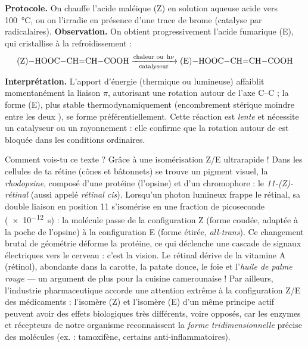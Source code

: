\documentclass[11pt]{article}
\newcommand{\cle}[1]{{\popxbold\color{popdark}#1}}
\begin{document}
\begin{experience}
\textbf{Protocole.} On chauffe l'acide maléique (Z) en solution aqueuse acide vers \SI{100}{\celsius}, ou on l'irradie en présence d'une trace de brome (catalyse par radicalaires).
\textbf{Observation.} On obtient progressivement l'acide fumarique (E), qui cristallise à la refroidissement :
\[ \ce{(Z)-HOOC-CH=CH-COOH ->[\text{chaleur ou } h\nu][\text{catalyseur}] (E)-HOOC-CH=CH-COOH} \]
\textbf{Interprétation.} L'apport d'énergie (thermique ou lumineuse) affaiblit momentanément la liaison $\pi$, autorisant une rotation autour de l'axe C--C ; la forme (E), plus stable thermodynamiquement (encombrement stérique moindre entre les deux ), se forme préférentiellement. Cette réaction est \emph{lente} et nécessite un catalyseur ou un rayonnement : elle confirme que la rotation autour de  est bloquée dans les conditions ordinaires.
\end{experience}

\begin{savaistu}
Comment vois-tu ce texte ? Grâce à une isomérisation Z/E ultrarapide ! Dans les cellules de ta rétine (cônes et bâtonnets) se trouve un pigment visuel, la \emph{rhodopsine}, composé d'une protéine (l'opsine) et d'un chromophore : le \emph{11-(Z)-rétinal} (aussi appelé \emph{rétinal cis}). Lorsqu'un photon lumineux frappe le rétinal, sa double liaison en position 11 s'isomérise en une fraction de picoseconde (\SI{e-12}{\second}) : la molécule passe de la configuration \cle{Z} (forme coudée, adaptée à la poche de l'opsine) à la configuration \cle{E} (forme étirée, \emph{all-trans}). Ce changement brutal de géométrie déforme la protéine, ce qui déclenche une cascade de signaux électriques vers le cerveau : c'est la vision. Le rétinal dérive de la vitamine A (rétinol), abondante dans la carotte, la patate douce, le foie et l'\emph{huile de palme rouge} — un argument de plus pour la cuisine camerounaise ! Par ailleurs, l'industrie pharmaceutique accorde une attention extrême à la configuration Z/E des médicaments : l'isomère (Z) et l'isomère (E) d'un même principe actif peuvent avoir des effets biologiques très différents, voire opposés, car les enzymes et récepteurs de notre organisme reconnaissent la \emph{forme tridimensionnelle} précise des molécules (ex. : tamoxifène, certains anti-inflammatoires).
\end{savaistu}
\end{document}
